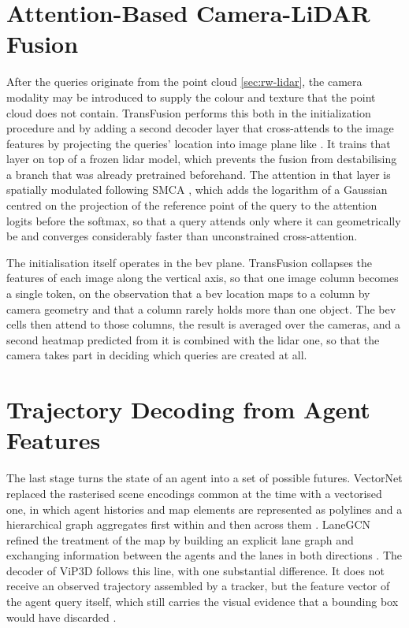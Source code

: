 \section{Attention-Based Camera-LiDAR Fusion}
\label{sec:rw-fusion}


After the queries originate from the point cloud \ref{sec:rw-lidar}, the camera modality may be introduced
to supply the colour and texture that the point cloud does not contain. TransFusion \cite{Bai2022TransFusion} 
performs this both in the initialization procedure and by adding a second decoder layer that cross-attends to the image features by projecting the queries' 
location into image plane like \cite{Zhu2021DeformableDETR}. It trains that layer on top of a frozen \ac{lidar} model,
which prevents the fusion from destabilising a branch that was already pretrained beforehand. The attention in that 
layer is spatially modulated following SMCA \cite{Gao2021SMCA}, which adds the logarithm of a Gaussian
centred on the projection of the reference point of the query to the attention logits before the softmax, 
so that a query attends only where it can geometrically be and converges considerably faster than
unconstrained cross-attention.

The initialisation itself operates in the \ac{bev} plane. TransFusion collapses
the features of each image along the vertical axis, so that one image column becomes a single token, on the
observation that a \ac{bev} location maps to a column by camera geometry and that a column rarely holds
more than one object. The \ac{bev} cells then attend to those columns, the result is averaged over the
cameras, and a second heatmap predicted from it is combined with the \ac{lidar} one, so that the camera
takes part in deciding which queries are created at all. 

\section{Trajectory Decoding from Agent Features}
\label{sec:rw-decoding}


The last stage turns the state of an agent into a set of possible futures. VectorNet replaced the
rasterised scene encodings common at the time with a vectorised one, in which agent histories and map
elements are represented as polylines and a hierarchical graph aggregates first within and then across them
\cite{VectorNet2020}. LaneGCN refined the treatment of the map by building an explicit lane graph and
exchanging information between the agents and the lanes in both directions \cite{Liang2020LaneGCN}. The
decoder of ViP3D follows this line, with one substantial difference. It does not receive an observed
trajectory assembled by a tracker, but the feature vector of the agent query itself, which still carries
the visual evidence that a bounding box would have discarded \cite{Gu2023ViP3D}.


